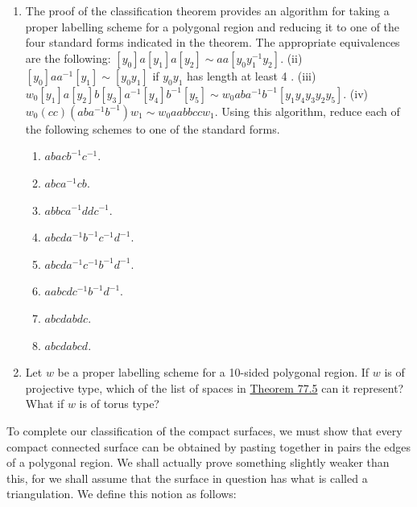 \begin{enumerate}[itemsep=0.4em, parsep=0pt, topsep=0pt, partopsep=0pt, leftmargin=*, label=\arabic*., ref=\arabic*]
\begin{enumerate}[itemsep=0.2em, parsep=0pt, topsep=0pt, partopsep=0pt, leftmargin=*, label=(\alph*), align=left]
 \item Write down the sequence of elementary operations required to carry out the arguments indicated in Figures 77.3, 77.4, and 77.5.
 \end{enumerate}
\item The proof of the classification theorem provides an algorithm for taking a proper labelling scheme for a polygonal region and reducing it to one of the four standard forms indicated in the theorem. The appropriate equivalences are the following:
 \([ y_{0}] a[ y_{1}] a[ y_{2}] \sim {aa}[ {y_{0}y_1^{-1}y_{2}}]\). (ii) \([ y_{0}] aa^{-1}[ y_{1}] \sim [ {y_{0}y_{1}}]\) if \(y_{0}y_{1}\) has length at least 4 . (iii) \(w_{0}[ y_{1}] a[ y_{2}] b[ y_{3}] a^{-1}[ y_{4}] b^{-1}[ y_{5}] \sim {w}_{0}{ab}a^{-1}b^{-1}[ {y_{1}y_{4}y_{3}y_{2}y_{5}}]\). (iv) \(w_{0}( {cc}) ( {{ab}a^{-1}b^{-1}}) w_{1} \sim {w}_{0}{aabbcc}w_{1}\). Using this algorithm, reduce each of the following schemes to one of the standard forms.
 \begin{enumerate}[itemsep=0.2em, parsep=0pt, topsep=0pt, partopsep=0pt, leftmargin=*, label=(\alph*), align=left]
 \item \({abac}b^{-1}c^{-1}\).
 \item \({abc}a^{-1}{cb}\).
 \item \({abbc}a^{-1}{dd}c^{-1}\).
 \item \({abcd}a^{-1}b^{-1}c^{-1}d^{-1}\).
 \item \({abcd}a^{-1}c^{-1}b^{-1}d^{-1}\).
 \item \({aabcd}c^{-1}b^{-1}d^{-1}\).
 \item \({abcdabdc}\).
 \item \({abcdabcd}\).
 \end{enumerate}
\item Let \(w\) be a proper labelling scheme for a 10-sided polygonal region. If \(w\) is of projective type, which of the list of spaces in \hyperref[thm:77.5]{Theorem 77.5} can it represent? What if \(w\) is of torus type?
\end{enumerate}

To complete our classification of the compact surfaces, we must show that every compact connected surface can be obtained by pasting together in pairs the edges of a polygonal region. We shall actually prove something slightly weaker than this, for we shall assume that the surface in question has what is called a triangulation. We define this notion as follows:

